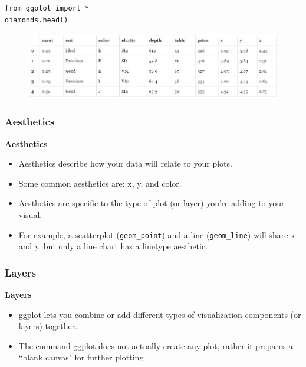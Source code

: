 \documentclass{beamer}
\begin{document}
\begin{frame}[fragile]
\begin{framed}
	\begin{verbatim}
from ggplot import *
diamonds.head()
\end{verbatim}
\end{framed}
\begin{figure}
\centering
\includegraphics[width=1.1\linewidth]{diamondsdata}

\end{figure}

\end{frame}	
\begin{frame}[fragile]
\frametitle{Aesthetics}
\Large
\noindent \textbf{Aesthetics}
\begin{itemize}
\item Aesthetics describe how your data will relate to your plots.
\item Some common aesthetics are: x, y, and color. \item Aesthetics are specific to the type of plot (or layer) you're adding to your visual. 
\item For example, a scatterplot (\texttt{geom\_point}) and a line (\texttt{geom\_line}) will share x and y, but only a line chart has a linetype aesthetic.
\end{itemize}


\end{frame}
\begin{frame}[fragile]
\frametitle{Layers}
\Large
\noindent \textbf{Layers}
\begin{itemize}
\item ggplot lets you combine or add different types of visualization components (or layers) together. 
\item The command ggplot does not actually create any plot, rather it prepares a ``blank canvas" for further plotting 
\end{itemize}

\end{frame}
\end{document}
